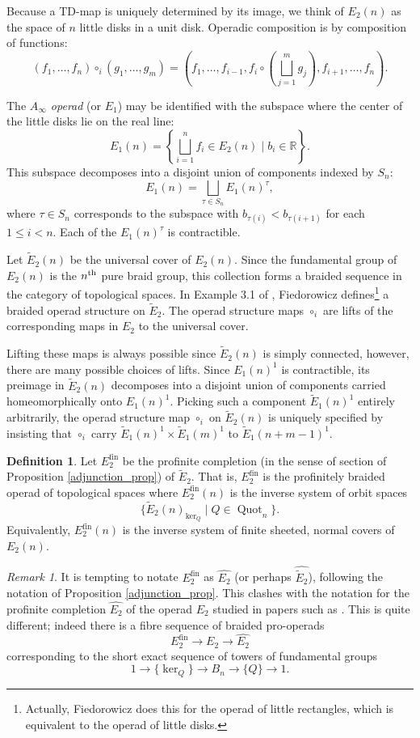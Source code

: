 \documentclass[12pt]{article}
\DeclareMathOperator{\Quot}{Quot}
\DeclareMathOperator{\fin}{fin}
\newcommand{\field}[1]{\mathbb{#1}}
\newcommand{\R}{\field{R}}
\newcommand{\Ct} {\widetilde{E}}
\newcommand{\nth}{\textsuperscript{th}}
\theoremstyle{plain}
\theoremstyle{definition}
\newtheorem{defn}[thm]{Definition}
\theoremstyle{remark}
\newtheorem{rem}[thm]{Remark}
\begin{document}
Because a TD-map is uniquely determined by its image, we think of $E_2(n)$ as the space of $n$ little disks in a unit disk.  Operadic composition is by composition of functions:
%
$$(f_1, \dots, f_n) \circ_i (g_1, \dots, g_m) = (f_1, \dots, f_{i-1}, f_i \circ (\bigsqcup_{j=1}^m g_j), f_{i+1}, \dots, f_n).$$

The \emph{$A_\infty$ operad} (or $E_1$) may be identified with the subspace where the center of the little disks lie on the real line:
%
$$E_1(n) = \left\{\bigsqcup_{i=1}^n f_i \in E_2(n) \; | \; b_i \in \R \right\}.$$
%
This subspace decomposes into a disjoint union of components indexed by $S_n$:
%
$$E_1(n) = \bigsqcup_{\tau \in S_n} E_1(n)^\tau,$$ 
%
where $\tau \in S_n$ corresponds to the subspace with $b_{\tau(i)}<b_{\tau(i+1)}$ for each $1 \leq i < n$.  Each of the $E_1(n)^{\tau}$ is contractible.

Let $\Ct_2(n)$ be the universal cover of $E_2(n)$.  Since the fundamental group of $E_2(n)$ is the $n\nth$ pure braid group, this collection forms a braided sequence in the category of topological spaces.  In Example 3.1 of \cite{fiedorowicz}, Fiedorowicz defines\footnote{Actually, Fiedorowicz does this for the operad of little rectangles, which is equivalent to the operad of little disks.} a braided operad structure on $\Ct_2$.  The operad structure maps $\circ_i$ are lifts of the corresponding maps in $E_2$ to the universal cover.  

Lifting these maps is always possible since $\Ct_2(n)$ is simply connected, however, there are many possible choices of lifts.  Since $E_1(n)^1$ is contractible, its preimage in $\Ct_2(n)$ decomposes into a disjoint union of components carried homeomorphically onto $E_1(n)^1$.  Picking such a component $\Ct_1(n)^1$ entirely arbitrarily, the operad structure map $\circ_i$ on $\Ct_2(n)$ is uniquely specified by insisting that $\circ_i$ carry $\Ct_1(n)^1 \times \Ct_1(m)^1$ to $\Ct_1(n+m-1)^1$.

\begin{defn} Let $E_2^{\fin}$ be the profinite completion (in the sense of section of Proposition \ref{adjunction_prop}) of $\Ct_2$.  That is, $E_2^{\fin}$ is the profinitely braided operad of topological spaces where $E_2^{\fin}(n)$ is the inverse system of orbit spaces
%
$$\{\Ct_2(n)_{\ker_Q}\; | \; Q \in \Quot_n\}.$$
%
Equivalently, $E_2^{\fin}(n)$ is the inverse system of finite sheeted, normal covers of $E_2(n)$.
\end{defn}

\begin{rem} It is tempting to notate $E_2^{\fin}$ as $\widehat{E_2}$ (or perhaps $\widehat{\Ct_2}$), following the notation of Proposition \ref{adjunction_prop}.  This clashes with the notation for the profinite completion $\widehat{E_2}$ of the operad $E_2$ studied in papers such as \cite{horel}.  This is quite different; indeed there is a fibre sequence of braided pro-operads 
%
$$E_2^{\fin} \to E_2 \to \widehat{E_2}$$
%
corresponding to the short exact sequence of towers of fundamental groups
%
$$1 \to \{\ker_Q\} \to B_n \to \{Q\} \to 1.$$

\end{rem}
\end{document}
